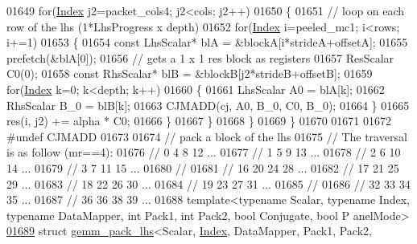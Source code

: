 \begin{DoxyCode}
01649       \textcolor{keywordflow}{for}(\hyperlink{namespace_eigen_a62e77e0933482dafde8fe197d9a2cfde}{Index} j2=packet\_cols4; j2<cols; j2++)
01650       \{
01651         \textcolor{comment}{// loop on each row of the lhs (1*LhsProgress x depth)}
01652         \textcolor{keywordflow}{for}(\hyperlink{namespace_eigen_a62e77e0933482dafde8fe197d9a2cfde}{Index} i=peeled\_mc1; i<rows; i+=1)
01653         \{
01654           \textcolor{keyword}{const} LhsScalar* blA = &blockA[i*strideA+offsetA];
01655           prefetch(&blA[0]);
01656           \textcolor{comment}{// gets a 1 x 1 res block as registers}
01657           ResScalar C0(0);
01658           \textcolor{keyword}{const} RhsScalar* blB = &blockB[j2*strideB+offsetB];
01659           \textcolor{keywordflow}{for}(\hyperlink{namespace_eigen_a62e77e0933482dafde8fe197d9a2cfde}{Index} k=0; k<depth; k++)
01660           \{
01661             LhsScalar A0 = blA[k];
01662             RhsScalar B\_0 = blB[k];
01663             CJMADD(cj, A0, B\_0, C0, B\_0);
01664           \}
01665           res(i, j2) += alpha * C0;
01666         \}
01667       \}
01668     \}
01669   \}
01670 
01671 
01672 \textcolor{preprocessor}{#undef CJMADD}
01673 
01674 \textcolor{comment}{// pack a block of the lhs}
01675 \textcolor{comment}{// The traversal is as follow (mr==4):}
01676 \textcolor{comment}{//   0  4  8 12 ...}
01677 \textcolor{comment}{//   1  5  9 13 ...}
01678 \textcolor{comment}{//   2  6 10 14 ...}
01679 \textcolor{comment}{//   3  7 11 15 ...}
01680 \textcolor{comment}{//}
01681 \textcolor{comment}{//  16 20 24 28 ...}
01682 \textcolor{comment}{//  17 21 25 29 ...}
01683 \textcolor{comment}{//  18 22 26 30 ...}
01684 \textcolor{comment}{//  19 23 27 31 ...}
01685 \textcolor{comment}{//}
01686 \textcolor{comment}{//  32 33 34 35 ...}
01687 \textcolor{comment}{//  36 36 38 39 ...}
01688 \textcolor{keyword}{template}<\textcolor{keyword}{typename} Scalar, \textcolor{keyword}{typename} Index, \textcolor{keyword}{typename} DataMapper, \textcolor{keywordtype}{int} Pack1, \textcolor{keywordtype}{int} Pack2, \textcolor{keywordtype}{bool} Conjugate, \textcolor{keywordtype}{bool} P
      anelMode>
\hyperlink{struct_eigen_1_1internal_1_1gemm__pack__lhs_3_01_scalar_00_01_index_00_01_data_mapper_00_01_pack35996411e68d7a1338c3213e7fcd18dc}{01689} \textcolor{keyword}{struct }\hyperlink{struct_eigen_1_1internal_1_1gemm__pack__lhs}{gemm\_pack\_lhs}<Scalar, \hyperlink{namespace_eigen_a62e77e0933482dafde8fe197d9a2cfde}{Index}, DataMapper, Pack1, Pack2, 

\end{DoxyCode}
